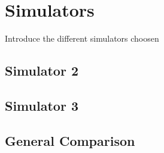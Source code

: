 \chapter{Simulators}
Introduce the different simulators choosen

\section{\MontiCar}
\section{Simulator 2}
\section{Simulator 3}

\section{General Comparison}



